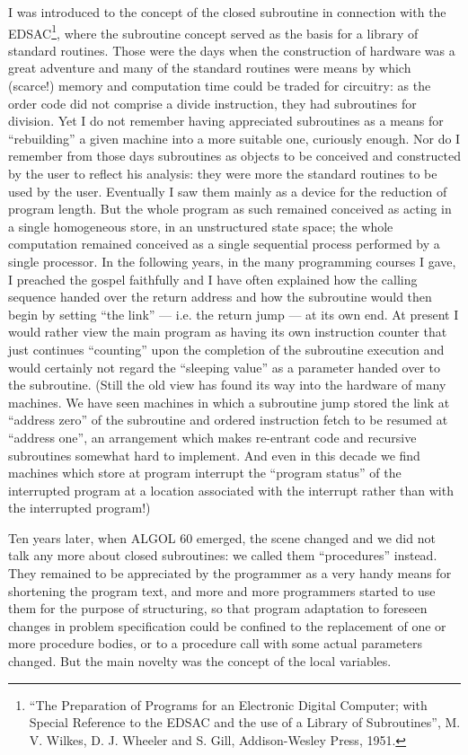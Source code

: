 I was introduced to the concept of the closed subroutine in connection with the EDSAC\footnote{``The Preparation of Programs for an Electronic Digital Computer; with Special Reference to the EDSAC and the use of a Library of Subroutines'', M. V. Wilkes, D. J. Wheeler and S. Gill, Addison-Wesley Press, 1951.}, where the subroutine concept served as the basis for a library of standard routines. Those were the days when the construction of hardware was a great adventure and many of the standard routines were means by which (scarce!) memory and computation time could be traded for circuitry: as the order code did not comprise a divide instruction, they had subroutines for division. Yet I do not remember having appreciated subroutines as a means for ``rebuilding'' a given machine into a more suitable one, curiously enough. Nor do I remember from those days subroutines as objects to be conceived and constructed by the user to reflect his analysis: they were more the standard routines to be used by the user. Eventually I saw them mainly as a device for the reduction of program length. But the whole program as such remained conceived as acting in a single homogeneous store, in an unstructured state space; the whole computation remained conceived as a single sequential process performed by a single processor. In the following years, in the many programming courses I gave, I preached the gospel faithfully and I have often explained how the calling sequence handed over the return address and how the subroutine would then begin by setting ``the link'' --- i.e. the return jump --- at its own end. At present I would rather view the main program as having its own instruction counter that just continues ``counting'' upon the completion of the subroutine execution and would certainly not regard the ``sleeping value'' as a parameter handed over to the subroutine. (Still the old view has found its way into the hardware of many machines. We have seen machines in which a subroutine jump stored the link at ``address zero'' of the subroutine and ordered instruction fetch to be resumed at ``address one'', an arrangement which makes re-entrant code and recursive subroutines somewhat hard to implement. And even in this decade we find machines which store at program interrupt the ``program status'' of the interrupted program at a location associated with the interrupt rather than with the interrupted program!)

Ten years later, when ALGOL 60 emerged, the scene changed and we did not talk any more about closed subroutines: we called them ``procedures'' instead. They remained to be appreciated by the programmer as a very handy means for shortening the program text, and more and more programmers started to use them for the purpose of structuring, so that program adaptation to foreseen changes in problem specification could be confined to the replacement of one or more procedure bodies, or to a procedure call with some actual parameters changed. But the main novelty was the concept of the local variables.

